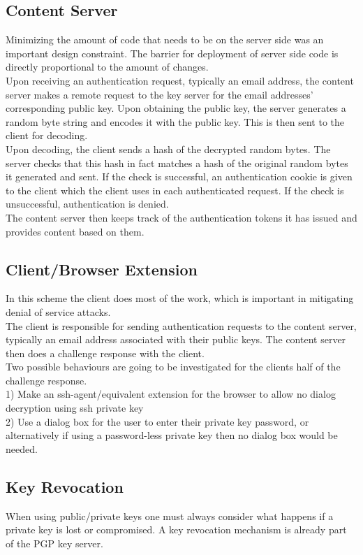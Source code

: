 \documentclass[11pt]{article}   %
\begin{document}
\subsection{Content Server} \label{sec:sol_server}
Minimizing the amount of code that needs to be on the server side was an important design constraint. The barrier for deployment of server side code is directly proportional to the amount of changes. \\
Upon receiving an authentication request, typically an email address, the content server makes a remote request to the key server for the email addresses' corresponding public key. Upon obtaining the public key, the server generates a random byte string and encodes it with the public key. This is then sent to the client for decoding. \\
Upon decoding, the client sends a hash of the decrypted random bytes. The server checks that this hash in fact matches a hash of the original random bytes it generated and sent. If the check is successful, an authentication cookie is given to the client which the client uses in each authenticated request. If the check is unsuccessful, authentication is denied. \\
The content server then keeps track of the authentication tokens it has issued and provides content based on them.

\subsection{Client/Browser Extension} \label{sec:sol_client}
In this scheme the client does most of the work, which is important in mitigating denial of service attacks.  \\
The client is responsible for sending authentication requests to the content server, typically an email address associated with their public keys. The content server then does a challenge response with the client. \\
Two possible behaviours are going to be investigated for the clients half of the challenge response. \\
1) Make an ssh-agent/equivalent extension for the browser to allow no dialog decryption using ssh private key \\
2) Use a dialog box for the user to enter their private key password, or alternatively if using a password-less private key then no dialog box would be needed.

\subsection{Key Revocation} \label{sec:sol_key_revo}
When using public/private keys one must always consider what happens if a private key is lost or compromised. A key revocation mechanism is already part of the PGP key server. 
\end{document}
